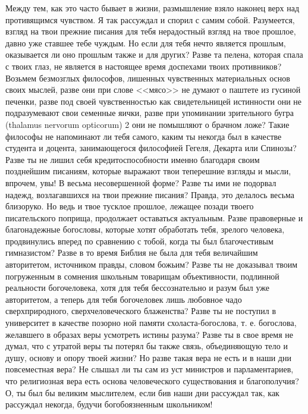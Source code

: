 \documentclass[12pt]{article}
\begin{document}
Между тем, как это часто бывает в жизни,  
размышление взяло наконец верх над противящимся чувством. 
Я так рассуждал и спорил с самим собой. Разумеется, 
взгляд на твои прежние писания для тебя  
нерадостный взгляд на твое прошлое, давно уже ставшее тебе 
чуждым. Но если для тебя нечто является прошлым, 
оказывается ли оно прошлым также и для других? 
Разве та пелена, которая спала с твоих глаз, не  
является в настоящее время доспехами твоих противников? 
Возьмем безмозглых философов, лишенных  
чувственных материальных основ своих мыслей, разве они при 
слове <<мясо>> не думают о паштете из гусиной печенки, разве под своей чувственностью как свидетельницей 
истинности они не подразумевают свои семенные  
яички, разве при упоминании зрительного бугра (thalamus 
nervorum opticorum) 2 они не помышляют о брачном 
ложе? Такие философы не напоминают ли тебя самого, 
каким ты некогда был в качестве студента и доцента, 
занимающегося философией Гегеля, Декарта или  
Спинозы? Разве ты не лишил себя кредитоспособности 
именно благодаря своим позднейшим писаниям,  
которые выражают твои теперешние взгляды и мысли,  
впрочем, увы! В весьма несовершенной форме? Разве ты 
ими не подорвал надежд, возлагавшихся на твои  
прежние писания? Правда, это делалось весьма близоруко. 
Но ведь и твое тусклое прошлое, лежащее позади  
твоего писательского поприща, продолжает оставаться  
актуальным. Разве правоверные и благонадежные  
богословы, которые хотят обработать тебя, зрелого  
человека, продвинулись вперед по сравнению с тобой, когда 
ты был благочестивым гимназистом? Разве в то время 
Библия не была для тебя величайшим авторитетом,  
источником правды, словом божьим? Разве ты не  
доказывал твоим погруженным в сомнения школьным  
товарищам объективности, подлинной реальности богочеловека, 
хотя для тебя бессознательно и разум был уже  
авторитетом, а теперь для тебя богочеловек лишь любовное 
чадо сверхприродного, сверхчеловеческого блаженства? 
Разве ты не поступил в университет в качестве  
позорно 
ной памяти схоласта-богослова, т. е. богослова,  
желавшего в образах веры усмотреть истины разума? Разве 
ты в свое время не думал, что с утратой веры ты  
потерял бы также связь, объединяющую тело и душу,  
основу и опору твоей жизни? Но разве такая вера не есть 
и в наши дни повсеместная вера? Не слышал ли ты 
сам из уст министров и парламентариев, что  
религиозная вера есть основа человеческого существования и 
благополучия? О, ты был бы великим мыслителем, если 
бив наши дни рассуждал так, как рассуждал некогда, 
будучи богобоязненным школьником!
\end{document}

